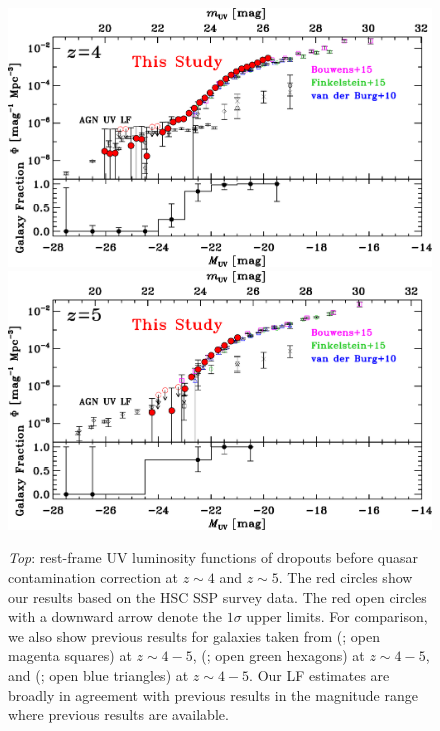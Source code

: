 \documentclass[]{pasj01}
\begin{document}
\begin{figure}
 \begin{center}
  \includegraphics[width=16cm]{LF_z4_ave.eps} 
  \includegraphics[width=16cm]{LF_z5_ave.eps} 
 \end{center}
\caption{
\textit{Top}: 
rest-frame UV luminosity functions of dropouts before quasar contamination correction 
at $z \sim 4$ and $z \sim 5$. 
The red circles show our results based on the HSC SSP survey data. 
The red open circles with a downward arrow 
denote the $1\sigma$ upper limits. 
For comparison, 
we also show previous results for galaxies taken from  
 (; open magenta squares) at $z \sim 4-5$, 
 (; open green hexagons) at $z \sim 4-5$, 
and 
 (; open blue triangles) at $z \sim 4-5$. 
Our LF estimates are broadly in agreement with previous results 
in the magnitude range where previous results are available. 
}
\end{figure}
\end{document}
